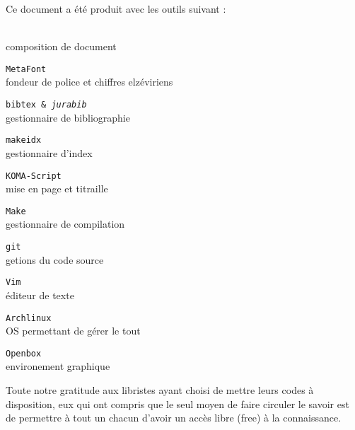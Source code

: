 
\newcommand\colophon[2]{\par\texttt{#1}\\ #2\medskip}

\cleardoublepage
\thispagestyle{empty}
\begin{center}
\small
Ce document a été produit avec les outils suivant :

\begin{multicols}{2}
\par\LaTeXe{}\\ composition de document\medskip
\colophon{MetaFont}{fondeur de police et chiffres elzéviriens}
\colophon{bibtex \& \emph{jurabib}}{gestionnaire de bibliographie}
\colophon{makeidx}{gestionnaire d'index}
\colophon{KOMA-Script}{mise en page et titraille}
\colophon{Make}{gestionnaire de compilation}
\colophon{git}{getions du code source}
\colophon{Vim}{éditeur de texte}
\colophon{Archlinux}{OS permettant de gérer le tout}
\colophon{Openbox}{environement graphique}
\end{multicols}

\bigskip

Toute notre gratitude aux libristes ayant choisi de mettre leurs codes à disposition,
eux qui ont compris que le seul moyen de faire circuler le savoir est de permettre
à tout un chacun d'avoir un accès libre (free) à la connaissance.

\bigskip\bigskip

\end{center}

